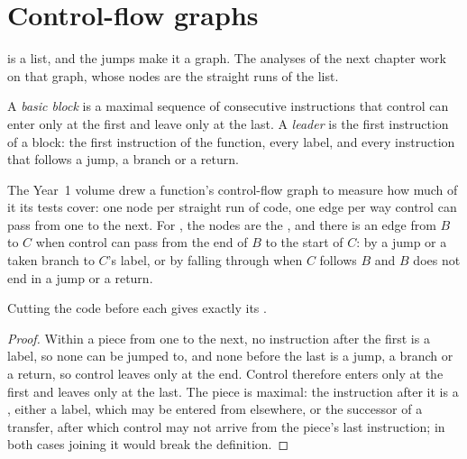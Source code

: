 \label{out:b3:code-generation:shortcircuit}

\section{Control-flow graphs}\label{sec:b3:code-generation:cfg}

 is a list, and the jumps make it a graph. The analyses of the next chapter work on that graph, whose nodes are the straight runs of the list.

\begin{definition}\label{def:b3:code-generation:cfg}
A \emph{basic block} is a maximal sequence of consecutive instructions that control can enter only at the first and leave only at the last. A \emph{leader} is the first instruction of a block: the first instruction of the function, every label, and every instruction that follows a jump, a branch or a return.
\end{definition}

\begin{recall}
The Year~1 volume drew a function's control-flow graph to measure how much of it its tests cover: one node per straight run of code, one edge per way control can pass from one to the next. For , the nodes are the , and there is an edge from $B$ to $C$ when control can pass from the end of $B$ to the start of $C$: by a jump or a taken branch to $C$'s label, or by falling through when $C$ follows $B$ and $B$ does not end in a jump or a return.
\end{recall}

\begin{proposition}\label{prop:b3:code-generation:leaders}
Cutting the code before each  gives exactly its .
\end{proposition}

\begin{proof}
Within a piece from one  to the next, no instruction after the first is a label, so none can be jumped to, and none before the last is a jump, a branch or a return, so control leaves only at the end. Control therefore enters only at the first and leaves only at the last. The piece is maximal: the instruction after it is a , either a label, which may be entered from elsewhere, or the successor of a transfer, after which control may not arrive from the piece's last instruction; in both cases joining it would break the definition.
\end{proof}

